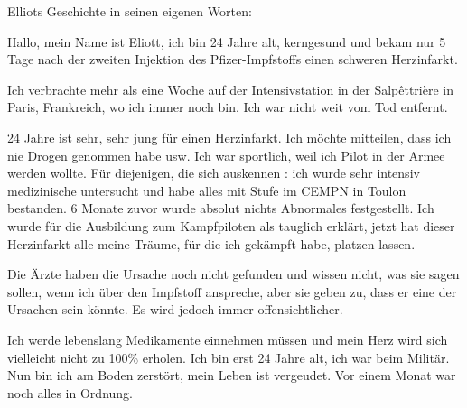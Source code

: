 Elliots Geschichte in seinen eigenen Worten:

Hallo, mein Name ist Eliott, ich bin 24 Jahre alt, kerngesund und bekam nur 5
Tage nach der zweiten Injektion des Pfizer-Impfstoffs einen schweren
Herzinfarkt.

Ich verbrachte mehr als eine Woche auf der Intensivstation in der Salpêttrière
in Paris, Frankreich, wo ich immer noch bin. Ich war nicht weit vom Tod
entfernt.

24 Jahre ist sehr, sehr jung für einen Herzinfarkt. Ich möchte mitteilen, dass
ich nie Drogen genommen habe usw. Ich war sportlich, weil ich Pilot in der Armee
werden wollte. Für diejenigen, die sich auskennen : ich wurde sehr intensiv
medizinische untersucht und habe alles mit Stufe im CEMPN in Toulon bestanden. 6
Monate zuvor wurde absolut nichts Abnormales festgestellt. Ich wurde für die
Ausbildung zum Kampfpiloten als tauglich erklärt, jetzt hat dieser Herzinfarkt
alle meine Träume, für die ich gekämpft habe, platzen lassen.

Die Ärzte haben die Ursache noch nicht gefunden und wissen nicht, was sie sagen
sollen, wenn ich über den Impfstoff anspreche, aber sie geben zu, dass er eine
der Ursachen sein könnte. Es wird jedoch immer offensichtlicher.

Ich werde lebenslang Medikamente einnehmen müssen und mein Herz wird sich
vielleicht nicht zu 100\% erholen. Ich bin erst 24 Jahre alt, ich war beim
Militär. Nun bin ich am Boden zerstört, mein Leben ist vergeudet. Vor einem
Monat war noch alles in Ordnung.
